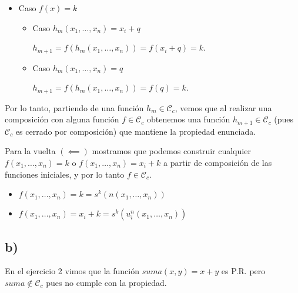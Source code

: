 \begin{itemize}
    \item Caso $f(x) = k$

    \begin{itemize}
        \item Caso $h_m(x_1, \dots, x_n) = x_i + q$

        $h_{m+1} = f(h_m(x_1, \dots, x_n)) = f(x_i + q) = k$.

        \item Caso $h_m(x_1, \dots, x_n) = q$

        $h_{m+1} = f(h_m(x_1, \dots, x_n)) = f(q) = k$.
    \end{itemize}
\end{itemize}

Por lo tanto, partiendo de una función $h_m \in \mathcal{C}_c$, vemos que al realizar una composición con alguna función $f \in \mathcal{C}_c$ obtenemos una función $h_{m+1} \in \mathcal{C}_c$ (pues $\mathcal{C}_c$ es cerrado por composición) que mantiene la propiedad enunciada.

Para la vuelta $(\impliedby)$ mostramos que podemos construir cualquier $f(x_1, \dots, x_n) = k$ o $f(x_1, \dots, x_n) = x_i + k$ a partir de composición de las funciones iniciales, y por lo tanto $f \in \mathcal{C}_c$.

\begin{itemize}
    \item $f(x_1, \dots, x_n) = k = s^k(n(x_1, \dots, x_n))$
    \item $f(x_1, \dots, x_n) = x_i + k = s^k(u^n_i(x_1, \dots, x_n))$
\end{itemize}

\subsection*{b)}

En el ejercicio 2 vimos que la función $suma(x, y) = x + y$ es P.R. pero $suma \notin \mathcal{C}_c$ pues no cumple con la propiedad.
